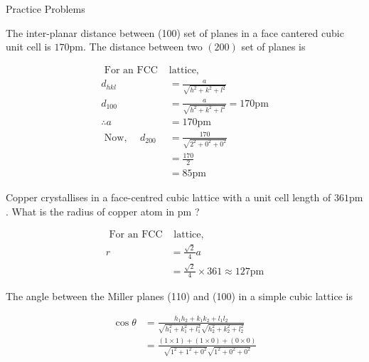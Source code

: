 \newpage
\begin{abox}
	Practice Problems
\end{abox}
\begin{enumerate}
	\begin{minipage}{\textwidth}
		\item The inter-planar distance between (100) set of planes in a face cantered cubic unit cell is $170 \mathrm{pm}$. The distance between two $(200)$ set of planes is
	\end{minipage}
	\begin{answer}
		\begin{align*}
		\text{	For an FCC }&\text{lattice,}\\
		d_{h k l} &=\frac{a}{\sqrt{h^{2}+k^{2}+l^{2}}} \\
		d_{100} &=\frac{a}{\sqrt{h^{2}+k^{2}+l^{2}}}=170 \mathrm{pm} \\
		\therefore a &=170 \mathrm{pm}\\
	\text{	Now, }\quad d_{200}&=\frac{170}{\sqrt{2^{2}+0^{2}+0^{2}}}\\
		&=\frac{170}{2} \\
		&=85 \mathrm{pm}
		\end{align*}
	\end{answer}
	\begin{minipage}{\textwidth}
		\item Copper crystallises in a face-centred cubic lattice with a unit cell length of $361 \mathrm{pm}$. What is the radius of copper atom in $\mathrm{pm}$ ? 
	\end{minipage}
	\begin{answer}
		\begin{align*}
	\text{	For an FCC}&\text{ lattice,}\\
		r &=\frac{\sqrt{2}}{4} a \\
		&=\frac{\sqrt{2}}{4} \times 361 \approx 127 \mathrm{pm}
		\end{align*}
	\end{answer}
	\begin{minipage}{\textwidth}
		\item  The angle between the Miller planes (110) and (100) in a simple cubic lattice is
	\end{minipage}
	\begin{answer}
		$$\begin{aligned}
		\cos \theta &=\frac{h_{1} h_{2}+k_{1} k_{2}+l_{1} l_{2}}{\sqrt{h_{1}^{2}+k_{1}^{2}+l_{1}^{2}} \sqrt{h_{2}^{2}+k_{2}^{2}+l_{2}^{2}}} \\
		&=\frac{(1 \times 1)+(1 \times 0)+(0 \times 0)}{\sqrt{1^{2}+1^{2}+0^{2}} \sqrt{1^{2}+0^{2}+0^{2}}} \\

\end{aligned}$$
\end{answer}
\end{enumerate}
